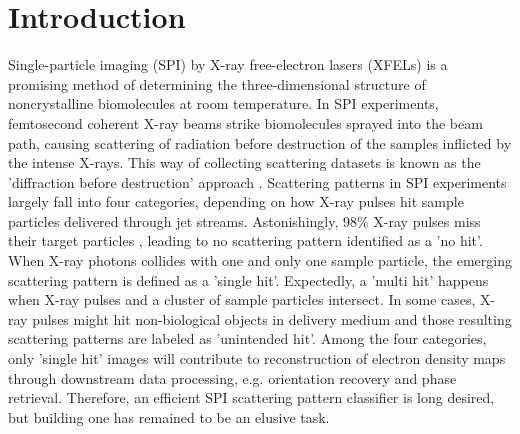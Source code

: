 \section{Introduction}


Single-particle imaging (SPI) by X-ray free-electron lasers (XFELs) is a
promising method of determining the three-dimensional structure of
noncrystalline biomolecules at room temperature.   In SPI experiments,
femtosecond coherent X-ray beams strike biomolecules sprayed into the beam path,
causing scattering of radiation before destruction of the samples inflicted by
the intense X-rays.  This way of collecting scattering datasets is known as the
'diffraction before destruction' approach
\cite{neutzePotentialBiomolecularImaging2000,
chapmanFemtosecondDiffractiveImaging2006,seibertSingleMimivirusParticles2011,
aquilaLinacCoherentLight2015,reddyCoherentSoftXray2017}.  Scattering patterns in
SPI experiments largely fall into four categories, depending on how X-ray pulses
hit sample particles delivered through jet streams.  Astonishingly, 98\% X-ray
pulses miss their target particles
\cite{shiEvaluationPerformanceClassification2019}, leading to no scattering
pattern identified as a 'no hit'.  When X-ray photons collides with one and only
one sample particle, the emerging scattering pattern is defined as a 'single
hit'. Expectedly, a 'multi hit' happens when X-ray pulses and a cluster of
sample particles intersect. In some cases, X-ray pulses might hit non-biological
objects in delivery medium and those resulting scattering patterns are labeled
as 'unintended hit'.  Among the four categories, only 'single hit' images will
contribute to reconstruction of electron density maps through downstream data
processing, e.g. orientation recovery and phase retrieval.  Therefore, an
efficient SPI scattering pattern classifier is long desired, but building one
has remained to be an elusive task.


% 

